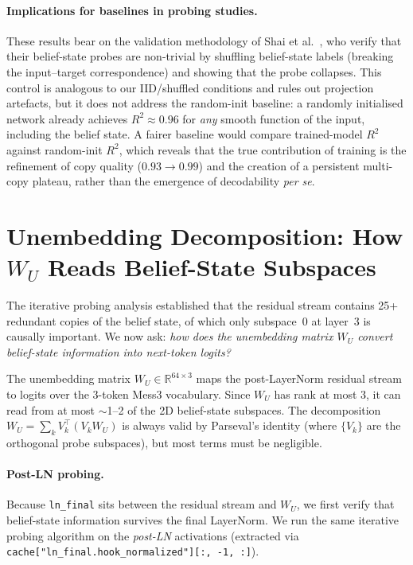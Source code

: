 \documentclass[11pt]{article}
\newcommand{\code}[1]{\texttt{#1}}
\begin{document}
\paragraph{Implications for baselines in probing studies.}
These results bear on the validation methodology of Shai et al.~\cite{shai2024transformers}, who verify that their belief-state probes are non-trivial by shuffling belief-state labels (breaking the input--target correspondence) and showing that the probe collapses.  This control is analogous to our IID/shuffled conditions and rules out projection artefacts, but it does not address the random-init baseline: a randomly initialised network already achieves $R^2 \approx 0.96$ for \emph{any} smooth function of the input, including the belief state.  A fairer baseline would compare trained-model $R^2$ against random-init $R^2$, which reveals that the true contribution of training is the refinement of copy quality ($0.93 \to 0.99$) and the creation of a persistent multi-copy plateau, rather than the emergence of decodability \emph{per se}.

\section{Unembedding Decomposition: How $W_U$ Reads Belief-State Subspaces}
\label{sec:unembed}

The iterative probing analysis established that the residual stream contains 25+ redundant copies of the belief state, of which only subspace~0 at layer~3 is causally important.  We now ask: \emph{how does the unembedding matrix $W_U$ convert belief-state information into next-token logits?}

The unembedding matrix $W_U \in \mathbb{R}^{64 \times 3}$ maps the post-LayerNorm residual stream to logits over the 3-token Mess3 vocabulary.  Since $W_U$ has rank at most 3, it can read from at most $\sim$1--2 of the 2D belief-state subspaces.  The decomposition $W_U = \sum_k V_k^\top (V_k W_U)$ is always valid by Parseval's identity (where $\{V_k\}$ are the orthogonal probe subspaces), but most terms must be negligible.

\paragraph{Post-LN probing.}
Because \code{ln\_final} sits between the residual stream and $W_U$, we first verify that belief-state information survives the final LayerNorm.  We run the same iterative probing algorithm on the \emph{post-LN} activations (extracted via \code{cache["ln\_final.hook\_normalized"][:, -1, :]}).
\end{document}
